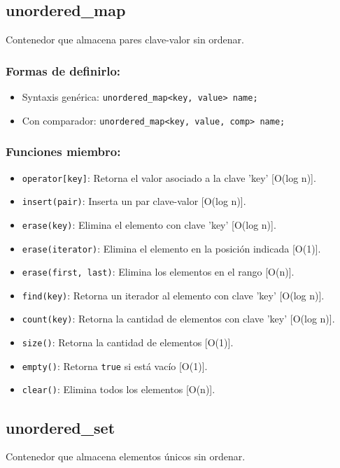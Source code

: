 \subsection{unordered\_map}
\label{subsec:std_unordered_map}
Contenedor que almacena pares clave-valor sin ordenar. 

\subsubsection{Formas de definirlo:}
\begin{itemize}
  \item Syntaxis genérica: \texttt{unordered\_map<key, value> name;}
  \item Con comparador: \texttt{unordered\_map<key, value, comp> name;}
\end{itemize}

\subsubsection{Funciones miembro:}
\begin{itemize}
  \item \texttt{operator[key]}: Retorna el valor asociado a la clave 'key' [O(log n)].
  \item \texttt{insert(pair)}: Inserta un par clave-valor [O(log n)]. 
  \item \texttt{erase(key)}: Elimina el elemento con clave 'key' [O(log n)].
  \item \texttt{erase(iterator)}: Elimina el elemento en la posición indicada [O(1)].
  \item \texttt{erase(first, last)}: Elimina los elementos en el rango [O(n)].
  \item \texttt{find(key)}: Retorna un iterador al elemento con clave 'key' [O(log n)]. 
  \item \texttt{count(key)}: Retorna la cantidad de elementos con clave 'key' [O(log n)]. 
  \item \texttt{size()}: Retorna la cantidad de elementos [O(1)]. 
  \item \texttt{empty()}: Retorna \texttt{true} si está vacío [O(1)]. 
  \item \texttt{clear()}: Elimina todos los elementos [O(n)]. 
\end{itemize}

\subsection{unordered\_set}
\label{subsec:std_unordered_set}
Contenedor que almacena elementos únicos sin ordenar. 

